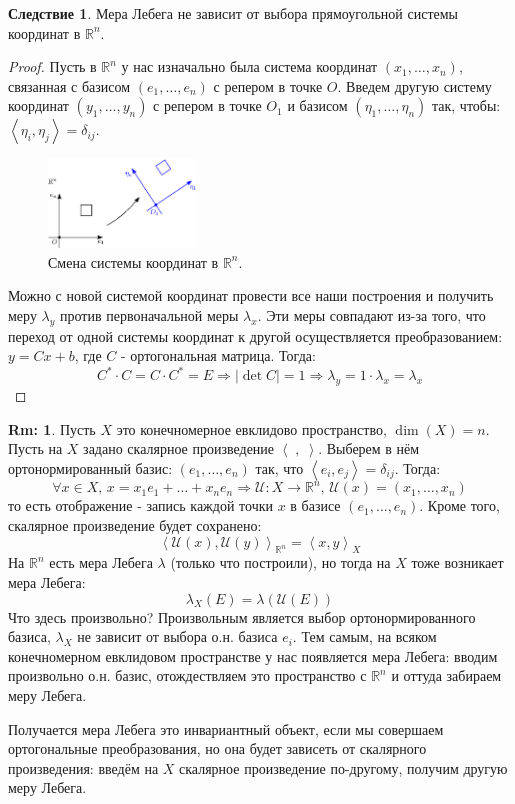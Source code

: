 \documentclass[12pt]{article}
\newcommand{\MR}{\mathbb{R}}
\newcommand{\MU}{\mathcal{U}}
\theoremstyle{definition}
\newtheorem{rem}{Rm:}
\newtheorem{corollary}{Следствие}
\newcommand{\inner}[2]{\left\langle #1, #2 \right\rangle }
\begin{document}
\begin{corollary}
	Мера Лебега не зависит от выбора прямоугольной системы координат в $\MR^n$.
\end{corollary}
\begin{proof}
	Пусть в $\MR^n$ у нас изначально была система координат $(x_1,\dotsc, x_n)$, связанная с базисом $(e_1, \dotsc, e_n)$ с репером в точке $O$. Введем другую систему координат $(y_1,\dotsc,y_n)$ с репером в точке $O_1$ и базисом $(\eta_1,\dotsc, \eta_n)$ так, чтобы: $\inner{\eta_i}{\eta_j} = \delta_{ij}$. 
	\begin{figure}[H]
		\centering
		\includegraphics[width=0.35\textwidth]{MA4L12_6.eps}
		\caption{Смена системы координат в $\MR^n$.}
		\label{12_6}
	\end{figure}
	Можно с новой системой координат провести все наши построения и получить меру $\lambda_y$ против первоначальной меры $\lambda_x$. Эти меры совпадают из-за того, что переход от одной системы координат к другой осуществляется преобразованием: $y = Cx + b$, где $C$ - ортогональная матрица. Тогда:
	$$
		 C^*{\cdot}C = C{\cdot}C^* = E \Rightarrow |\det{C}| = 1 \Rightarrow \lambda_y = 1{\cdot}\lambda_x = \lambda_x
	$$
\end{proof}
\begin{rem}
	Пусть $X$ это конечномерное евклидово пространство, $\dim{(X)} = n$. Пусть на $X$ задано скалярное произведение $\inner{\;}{\;}$. Выберем в нём ортонормированный базис: $(e_1, \dotsc, e_n)$ так, что $\inner{e_i}{e_j} = \delta_{ij}$. Тогда:
	$$
		\forall x \in X, \, x = x_1e_1 + \dotsc + x_n e_n \Rightarrow \MU \colon X \to \MR^n, \, \MU(x) = (x_1, \dotsc, x_n)
	$$
	то есть отображение - запись каждой точки $x$ в базисе $(e_1, \dotsc, e_n)$. Кроме того, скалярное произведение будет сохранено:
	$$	
		\inner{\MU(x)}{\MU(y)}_{\MR^n} = \inner{x}{y}_X
	$$
	На $\MR^n$ есть мера Лебега $\lambda$ (только что построили), но тогда на $X$ тоже возникает мера Лебега:
	$$
		\lambda_X(E) = \lambda(\MU(E))
	$$
	Что здесь произвольно? Произвольным является выбор ортонормированного базиса, $\lambda_X$ не зависит от выбора о.н. базиса $e_i$. Тем самым, на всяком конечномерном евклидовом пространстве у нас появляется мера Лебега: вводим произвольно о.н. базис, отождествляем это пространство с $\MR^n$ и оттуда забираем меру Лебега.
	
	Получается мера Лебега это инвариантный объект, если мы совершаем ортогональные преобразования, но она будет зависеть от скалярного произведения: введём на $X$ скалярное произведение по-другому, получим другую меру Лебега.
\end{rem}
\end{document}

